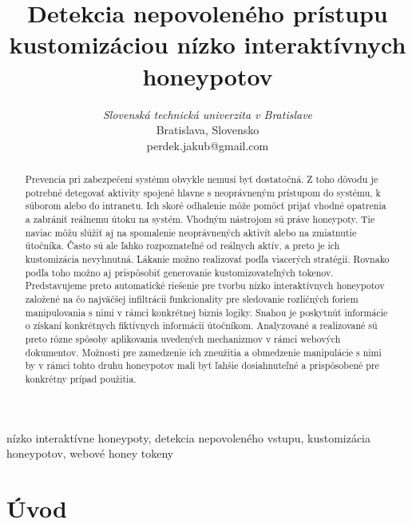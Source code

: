 \documentclass[conference, 11pt,slovak,a4paper,twoside]{IEEEtran}
\begin{document}
\title{Detekcia nepovoleného prístupu kustomizáciou nízko interaktívnych honeypotov}

\author{
\textit{Slovenská technická univerzita v Bratislave}\\
Bratislava, Slovensko \\
perdek.jakub@gmail.com}

\maketitle

\begin{abstract}
Prevencia pri zabezpečení systému obvykle nemusí byť dostatočná. Z toho dôvodu je potrebné detegovať aktivity spojené hlavne s neoprávneným prístupom do systému, k súborom alebo do intranetu. Ich skoré odhalenie môže pomôcť prijať vhodné opatrenia a zabrániť reálnemu útoku na systém. Vhodným nástrojom sú práve honeypoty. Tie naviac môžu slúžiť aj na spomalenie neoprávnených aktivít alebo na zmiatnutie útočníka. Často sú ale ľahko rozpoznateľné od reálnych aktív, a preto je ich kustomizácia nevyhnutná. Lákanie možno realizovať podľa viacerých stratégií. Rovnako podľa toho možno aj prispôsobiť generovanie kustomizovateľných tokenov. Predstavujeme preto automatické riešenie pre tvorbu nízko interaktívnych honeypotov založené na čo najväčšej infiltrácii funkcionality pre sledovanie rozličných foriem manipulovania s nimi v rámci konkrétnej biznis logiky. Snahou je poskytnúť informácie o získaní konkrétnych fiktívnych informácií útočníkom. Analyzované a realizované sú preto rôzne spôsoby aplikovania uvedených mechanizmov v rámci webových dokumentov. Možnosti pre zamedzenie ich zneužitia a obmedzenie manipulácie s nimi by v rámci tohto druhu honeypotov mali byť ľahšie dosiahnuteľné a prispôsobené pre konkrétny prípad použitia.   
\end{abstract}

\begin{IEEEkeywords}
nízko interaktívne honeypoty, detekcia nepovoleného vstupu, kustomizácia honeypotov, webové honey tokeny
\end{IEEEkeywords}


\section{Úvod} \label{introduction}
\end{document}
